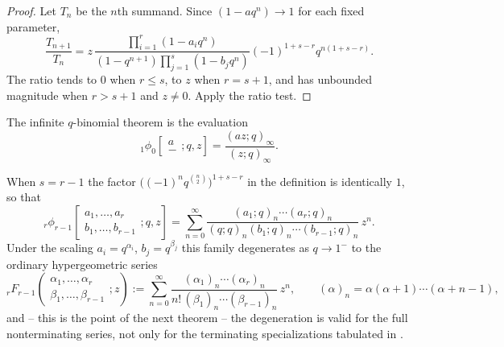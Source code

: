 \documentclass[11pt,oneside,openany]{book}
\theoremstyle{definition}
\theoremstyle{remark}
\newcommand{\poch}[3]{(#1;#2)_{#3}}
\newcommand{\defeq}{\mathrel{:=}}
\begin{document}
\begin{proof}
Let $T_n$ be the $n$th summand.  Since $(1-aq^n)\to1$ for each fixed parameter,
\[
 \frac{T_{n+1}}{T_n}
 =z\,\frac{\prod_{i=1}^{r}(1-a_iq^n)}
 {(1-q^{n+1})\prod_{j=1}^{s}(1-b_jq^n)}
 (-1)^{1+s-r}q^{n(1+s-r)}.
\]
The ratio tends to $0$ when $r\le s$, to $z$ when $r=s+1$, and has unbounded magnitude when $r>s+1$ and $z\ne0$.  Apply the ratio test.
\end{proof}

The infinite $q$-binomial theorem is the evaluation
\[
 {}_1\phi_0\!\left[\begin{matrix}a\\-\end{matrix};q,z\right]
 =\frac{(az;q)_\infty}{(z;q)_\infty}.
\]



When $s=r-1$ the factor $\bigl((-1)^nq^{\binom n2}\bigr)^{1+s-r}$ in the definition is identically $1$, so that
\[
 {}_r\phi_{r-1}\!\left[
 \begin{matrix}a_1,\dots,a_r\\ b_1,\dots,b_{r-1}\end{matrix};q,z\right]
 =\sum_{n=0}^{\infty}
 \frac{\poch{a_1}{q}{n}\cdots\poch{a_r}{q}{n}}
      {\poch{q}{q}{n}\poch{b_1}{q}{n}\cdots\poch{b_{r-1}}{q}{n}}\,z^n .
\]
Under the scaling $a_i=q^{\alpha_i}$, $b_j=q^{\beta_j}$ this family degenerates as $q\to1^-$ to the ordinary hypergeometric series
\[
 {}_rF_{r-1}\!\left(
 \begin{matrix}\alpha_1,\dots,\alpha_r\\ \beta_1,\dots,\beta_{r-1}\end{matrix};z\right)
 \defeq\sum_{n=0}^{\infty}
 \frac{(\alpha_1)_n\cdots(\alpha_r)_n}
      {n!\,(\beta_1)_n\cdots(\beta_{r-1})_n}\,z^n,
 \qquad
 (\alpha)_n=\alpha(\alpha+1)\cdots(\alpha+n-1),
\]
and -- this is the point of the next theorem -- the degeneration is valid for the full nonterminating series, not only for the terminating specializations tabulated in .
\end{document}
